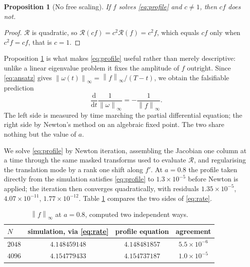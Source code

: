 \documentclass[11pt]{article}
\newtheorem{proposition}{Proposition}
\theoremstyle{definition}
\newcommand{\norm}[1]{\left\lVert #1 \right\rVert}
\begin{document}
\begin{proposition}[No free scaling]
\label{prop:scaling}
If $f$ solves \eqref{eq:profile} and $c\ne 1$, then $cf$ does not.
\end{proposition}

\begin{proof}
$\mathcal{R}$ is quadratic, so $\mathcal{R}(cf) = c^2\mathcal{R}(f) = c^2 f$,
which equals $cf$ only when $c^2 f = cf$, that is $c=1$.
\end{proof}

Proposition \ref{prop:scaling} is what makes \eqref{eq:profile} useful rather
than merely descriptive: unlike a linear eigenvalue problem it fixes the
amplitude of $f$ outright. Since \eqref{eq:ansatz} gives
$\norm{\omega(t)}_\infty = \norm{f}_\infty/(T-t)$, we obtain the falsifiable
prediction
\begin{equation}
  \frac{\mathrm{d}}{\mathrm{d}t}\frac{1}{\norm{\omega}_\infty}
  = -\frac{1}{\norm{f}_\infty}.
  \label{eq:rate}
\end{equation}
The left side is measured by time marching the partial differential equation;
the right side by Newton's method on an algebraic fixed point. The two share
nothing but the value of $a$.

We solve \eqref{eq:profile} by Newton iteration, assembling the Jacobian one
column at a time through the same masked transforms used to evaluate
$\mathcal{R}$, and regularising the translation mode by a rank one shift along
$f'$. At $a=0.8$ the profile taken directly from the simulation satisfies
\eqref{eq:profile} to $1.3\times10^{-5}$ before Newton is applied; the
iteration then converges quadratically, with residuals $1.35\times10^{-5}$,
$4.07\times10^{-11}$, $1.77\times10^{-12}$. Table \ref{tab:amp} compares the
two sides of \eqref{eq:rate}.

\begin{table}[htbp]
\centering
\begin{tabular}{lccc}
\toprule
$N$ & simulation, via \eqref{eq:rate} & profile equation & agreement\\
\midrule
$2048$ & $4.148459148$ & $4.148481857$ & $5.5\times10^{-6}$\\
$4096$ & $4.154779433$ & $4.154737187$ & $1.0\times10^{-5}$\\
\bottomrule
\end{tabular}
\caption{$\norm{f}_\infty$ at $a=0.8$, computed two independent ways.}
\label{tab:amp}
\end{table}
\end{document}
